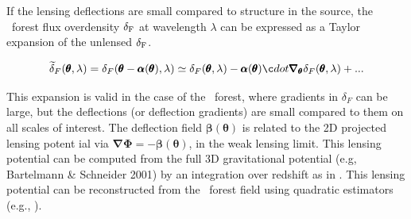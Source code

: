 If the lensing deflections are small
compared to structure in the source, the \lya\ forest 
flux overdensity $\delta_{\rm F}$  at wavelength $\lambda$ can
be expressed as a Taylor expansion of the unlensed $\delta_{\rm F}$.

\begin{equation}
\widetilde{\delta}_{F}({ \pmb {\theta}},\lambda)=
{\delta_{F}}({ \pmb {\theta}} - {\pmb { \alpha}}({\pmb {\theta}}) ,\lambda)
\simeq {\delta_{F}} ({\pmb{\theta}},\lambda) - {\pmb {\alpha}}({\pmb{\theta}})\c
dot
{\pmb{\nabla_{\theta}}} \delta_{F} ({\pmb{\theta}},\lambda) + ...
\label{taylor}
\end{equation}

 This expansion is  valid in the case of the \lya\ forest, where gradients
in $\delta_{F}$ can be large, but the deflections (or deflection gradients) 
are small compared to them on all scales of interest. The deflection field
${\pmb {\beta}}( {\pmb {\theta}})$ is related to the 2D projected lensing potent
ial via
${\pmb {\nabla \Phi}} =- {\pmb {\beta}}({\pmb {\theta}} )$,
in the weak lensing limit. This lensing potential can be
computed from the full 3D gravitational
potential (e.g, Bartelmann \& Schneider 2001) by an integration
over redshift as in .
This lensing potential
can  be reconstructed from the \lya\ forest field using 
quadratic estimators (e.g., \cite{okamoto}).

